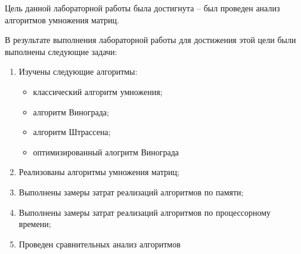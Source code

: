Цель данной лабораторной работы была достигнута -- был проведен анализ алгоритмов умножения матриц.

В результате выполнения лабораторной работы для достижения этой цели были выполнены следующие задачи:
\begin{enumerate}
    \item Изучены следующие алгоритмы: %
    \begin{itemize}    
        \item классический алгоритм умножения;
        \item алгоритм Винограда;
        \item алгоритм Штрассена;        
        \item оптимизированный алогритм Винограда
    \end{itemize}
    \item Реализованы алгоритмы умножения матриц;%
    \item Выполнены замеры затрат реализаций алгоритмов по памяти;
    \item Выполнены замеры затрат реализаций алгоритмов по процессорному времени;
    \item Проведен сравнительных анализ алгоритмов
\end{enumerate}
